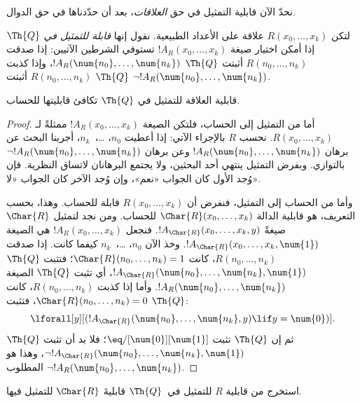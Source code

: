 \documentclass[../../../include/open-logic-section]{subfiles}
\begin{document}


نحدّ الآن قابلية التمثيل في حق \emph{العلاقات}، بعد أن حدّدناها في حق الدوال.

\begin{defn}
 لتكن
$R(x_0,\dots,x_k)$ علاقة على الأعداد الطبيعية.
نقول إنها {\em قابلة للتمثيل في $\Th{Q}$} إذا أمكن اختيار صيغة
$!A_R(x_0,\dots,x_k)$ تستوفي الشرطين الآتيين:
إذا صدقت $R(n_0,\dots,n_k)$ أثبتت $\Th{Q}$
$!A_R(\num{n_0},\dots,\num{n_k})$،
وإذا كذبت $R(n_0,\dots,n_k)$ أثبتت $\Th{Q}$
$\lnot !A_R(\num{n_0},\dots,\num{n_k})$.
\end{defn}

\begin{thm}
 قابلية العلاقة للتمثيل في
$\Th{Q}$ تكافئ قابليتها للحساب.
\end{thm}

\begin{proof}
أما من التمثيل إلى الحساب، فلتكن الصيغة $!A_R(x_0,\dots,x_k)$ ممثلةً
لـ$R(x_0,\dots,x_k)$. نحسب $R$ بالإجراء الآتي:
إذا أعطيت $n_0$، \dots،~$n_k$، أجرينا البحث عن برهان
$!A_R(\num{n_0},\dots,\num{n_k})$ وعن برهان
$\lnot !A_R(\num{n_0},\dots,\num{n_k})$ بالتوازي.
وبفرض التمثيل ينتهي أحد البحثين، ولا يجتمع البرهانان لاتساق النظرية.
فإن وُجد الأول كان الجواب «نعم»، وإن وُجد الآخر كان الجواب «لا».

وأما من الحساب إلى التمثيل، فنفرض أن $R(x_0,\dots,x_k)$ قابلة للحساب.
وهذا، بحسب التعريف، هو قابلية الدالة $\Char{R}(x_0,\dots,x_k)$ للحساب.
ومن  نجد لتمثيل $\Char{R}$
صيغةً $!A_{\Char{R}}(x_0,\dots,x_k,y)$.
فنجعل $!A_R(x_0,\dots,x_k)$ هي الصيغة
$!A_{\Char{R}}(x_0,\dots,x_k,\num{1})$.
وخذ الآن $n_0$، \dots،~$n_k$ كيفما كانت.
إذا صدقت $R(n_0,\dots,n_k)$، كانت
$\Char{R}(n_0,\dots,n_k)=1$؛ فتثبت $\Th{Q}$
$!A_{\Char{R}}(\num{n_0},\dots,\num{n_k},\num{1})$،
أي تثبت $\Th{Q}$ الصيغة $!A_R(\num{n_0},\dots,\num{n_k})$.
وأما إذا كذبت $R(n_0,\dots,n_k)$، كانت $\Char{R}(n_0,\dots,n_k)=0$،
فتثبت $\Th{Q}$:
\[
\lforall[y][(!A_{\Char{R}}(\num{n_0}, \dots, \num{n_k}, y) \lif y =
  \num{0})].
\]
ثم إن $\Th{Q}$ تثبت $\eq/[\num{0}][\num{1}]$؛
فلا بد أن تثبت $\Th{Q}$
$\lnot !A_{\Char{R}}(\num{n_0},\dots,\num{n_k},\num{1})$،
وهذا هو $\lnot !A_R(\num{n_0},\dots,\num{n_k})$ المطلوب.
\end{proof}

\begin{prob}
استخرج من قابلية $R$ للتمثيل في~$\Th{Q}$
قابليةَ $\Char{R}$ للتمثيل فيها.
\end{prob}
\end{document}
